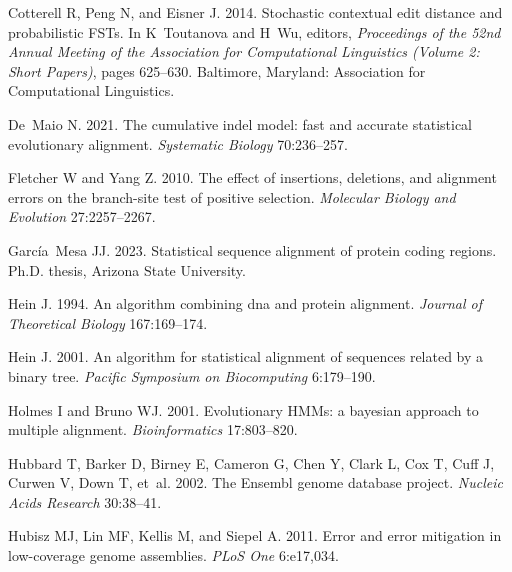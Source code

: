 \documentclass[12pt,letterpaper]{article}
\begin{document}
\begin{thebibliography}{43}
Cotterell R, Peng N, and Eisner J. 2014.
\newblock Stochastic contextual edit distance and probabilistic {FST}s.
\newblock In K~Toutanova and H~Wu, editors, \emph{Proceedings of the 52nd
  Annual Meeting of the Association for Computational Linguistics (Volume 2:
  Short Papers)}, pages 625--630. Baltimore, Maryland: Association for
  Computational Linguistics.

De~Maio N. 2021.
\newblock The cumulative indel model: fast and accurate statistical
  evolutionary alignment.
\newblock \emph{Systematic Biology} 70:236--257.

Fletcher W and Yang Z. 2010.
\newblock The effect of insertions, deletions, and alignment errors on the
  branch-site test of positive selection.
\newblock \emph{Molecular Biology and Evolution} 27:2257--2267.

Garc\'{i}a~Mesa JJ. 2023.
\newblock Statistical sequence alignment of protein coding regions.
\newblock Ph.D. thesis, Arizona State University.

Hein J. 1994.
\newblock An algorithm combining dna and protein alignment.
\newblock \emph{Journal of Theoretical Biology} 167:169--174.

Hein J. 2001.
\newblock An algorithm for statistical alignment of sequences related by a
  binary tree.
\newblock \emph{Pacific Symposium on Biocomputing} 6:179--190.

Holmes I and Bruno WJ. 2001.
\newblock Evolutionary {HMMs}: a bayesian approach to multiple alignment.
\newblock \emph{Bioinformatics} 17:803--820.

Hubbard T, Barker D, Birney E, Cameron G, Chen Y, Clark L, Cox T, Cuff J,
  Curwen V, Down T, et~al. 2002.
\newblock The {Ensembl} genome database project.
\newblock \emph{Nucleic Acids Research} 30:38--41.

Hubisz MJ, Lin MF, Kellis M, and Siepel A. 2011.
\newblock Error and error mitigation in low-coverage genome assemblies.
\newblock \emph{{PLoS} One} 6:e17,034.


\end{thebibliography}
\end{document}

